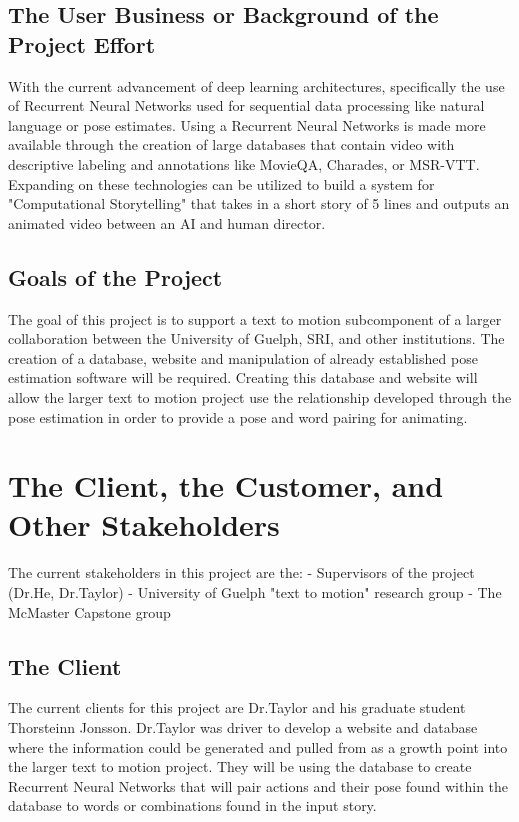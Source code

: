 \documentclass{scrreprt}
\begin{document}
\subsection{The User Business or Background of the Project Effort}

With the current advancement of deep learning architectures, specifically the
use of Recurrent Neural Networks used for sequential data processing like
natural language or pose estimates. Using a Recurrent Neural Networks is made
more available through the creation of large databases that contain video with
descriptive labeling and annotations like MovieQA, Charades, or MSR-VTT.
Expanding on these technologies can be utilized to build a system for
"Computational Storytelling" that takes in a short story of 5 lines and outputs
an animated video between an AI and human director.

\subsection{Goals of the Project}

The goal of this project is to support a text to motion subcomponent of a
larger collaboration between the University of Guelph, SRI, and other
institutions. The creation of a database, website and manipulation of already
established pose estimation software will be required. Creating this database
and website will allow the larger text to motion project use the relationship
developed through the pose estimation in order to provide a pose and word
pairing for animating.

\section{The Client, the Customer, and Other Stakeholders}

The current stakeholders in this project are the:
    - Supervisors of the project (Dr.He, Dr.Taylor)
    - University of Guelph "text to motion" research group
    - The McMaster Capstone group

\subsection{The Client}

The current clients for this project are Dr.Taylor and his graduate student
Thorsteinn Jonsson. Dr.Taylor was driver to develop a website and database where
the information could be generated and pulled from as a growth point into the
larger text to motion project. They will be using the database to create
Recurrent Neural Networks that will pair actions and their pose found within
the database to words or combinations found in the input story.
\end{document}
